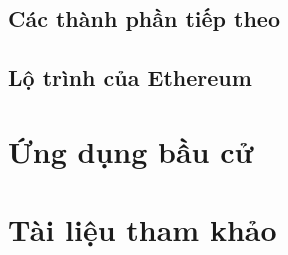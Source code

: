 \documentclass[12pt]{article}
\begin{document}
	\subsection{Các thành phần tiếp theo}
	
	
	\subsection{Lộ trình của Ethereum}
	
	
	\section{Ứng dụng bầu cử}
	
	
	\section{Tài liệu tham khảo}
	
\end{document}
